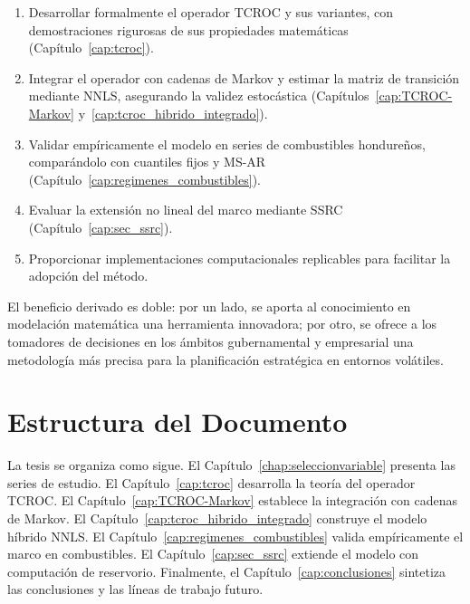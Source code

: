 \begin{enumerate}
    \item Desarrollar formalmente el operador TCROC y sus variantes,
    con demostraciones rigurosas de sus propiedades matemáticas
    (Capítulo~\ref{cap:tcroc}).

    \item Integrar el operador con cadenas de Markov y estimar la
    matriz de transición mediante NNLS, asegurando la validez
    estocástica (Capítulos~\ref{cap:TCROC-Markov}
    y~\ref{cap:tcroc_hibrido_integrado}).

    \item Validar empíricamente el modelo en series de combustibles
    hondureños, comparándolo con cuantiles fijos y MS-AR
    (Capítulo~\ref{cap:regimenes_combustibles}).

    \item Evaluar la extensión no lineal del marco mediante SSRC
    (Capítulo~\ref{cap:sec_ssrc}).

    \item Proporcionar implementaciones computacionales replicables
    para facilitar la adopción del método.
\end{enumerate}

El beneficio derivado es doble: por un lado, se aporta al
conocimiento en modelación matemática una herramienta innovadora; por
otro, se ofrece a los tomadores de decisiones en los ámbitos
gubernamental y empresarial una metodología más precisa para la
planificación estratégica en entornos volátiles.

\section{Estructura del Documento}
\label{sec:estructura}

La tesis se organiza como sigue.  El
Capítulo~\ref{chap:seleccionvariable} presenta las series de
estudio.  El Capítulo~\ref{cap:tcroc} desarrolla la teoría del
operador TCROC.  El Capítulo~\ref{cap:TCROC-Markov} establece la
integración con cadenas de Markov.  El
Capítulo~\ref{cap:tcroc_hibrido_integrado} construye el modelo
híbrido NNLS.  El Capítulo~\ref{cap:regimenes_combustibles} valida
empíricamente el marco en combustibles.  El
Capítulo~\ref{cap:sec_ssrc} extiende el modelo con computación de
reservorio.  Finalmente, el Capítulo~\ref{cap:conclusiones}
sintetiza las conclusiones y las líneas de trabajo futuro.

